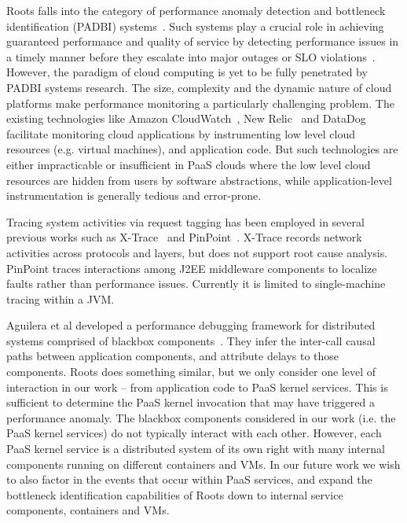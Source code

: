 Roots falls into the category of performance anomaly detection and bottleneck identification 
(PADBI) systems~\cite{Ibidunmoye:2015:PAD:2808687.2791120}. 
Such systems play a crucial role in achieving guaranteed performance and
quality of service by detecting performance issues in a timely manner before they escalate into major outages
or SLO violations~\cite{6045942}. 
However, the paradigm of cloud computing is yet to be
fully penetrated by PADBI systems research. The size, complexity and the dynamic nature of 
cloud platforms make performance monitoring a particularly challenging problem.
The existing technologies like Amazon CloudWatch~\cite{cloudwatch},
New Relic~\cite{newrelic} and DataDog~\cite{datadog} facilitate monitoring cloud applications 
by instrumenting low level cloud resources (e.g. virtual machines), and application code. But such technologies
are either impracticable or insufficient in
PaaS clouds where the low level cloud resources are hidden from users by software abstractions, while
application-level instrumentation is generally tedious and error-prone.

Tracing system activities via request tagging has been employed in several
previous works such as X-Trace~\cite{Fonseca:2007:XPN:1973430.1973450} and 
PinPoint~\cite{Chen:2002:PPD:647883.738238}.
X-Trace records network activities across protocols and layers, but
does not support root cause analysis. PinPoint traces
interactions among J2EE middleware components to localize faults rather than performance
issues. Currently it is limited to single-machine tracing within a JVM.

Aguilera et al developed a performance debugging framework for distributed systems comprised of
blackbox components~\cite{Aguilera:2003:PDD:945445.945454}. 
They infer the inter-call causal paths between application components, and attribute delays to those
components. Roots does something similar, but we only consider one level of
interaction in our work -- from application code to PaaS kernel services. This is sufficient
to determine the PaaS kernel invocation that may have triggered a performance anomaly.
The blackbox components considered in our work (i.e. the PaaS kernel services) do not
typically interact with each other. However, each PaaS kernel service is a distributed system
of its own right with many internal components running on different containers and VMs.
In our future work we wish to also factor in the events that occur within PaaS services, 
and expand the bottleneck identification capabilities of Roots down to internal
service components, containers and VMs.

